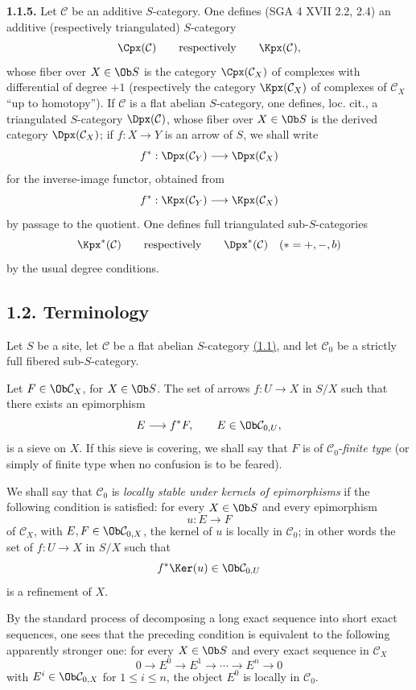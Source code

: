 \textbf{1.1.5.} Let \(\mathcal C\) be an additive \(S\)-category. One defines (SGA 4 XVII 2.2, 2.4) an additive (respectively triangulated) \(S\)-category
\[
  \Cpx(\mathcal C)\qquad\text{respectively}\qquad \Kpx(\mathcal C),
\]
whose fiber over \(X\in\Ob S\) is the category \(\Cpx(\mathcal C_X)\) of complexes with differential of degree \(+1\) (respectively the category \(\Kpx(\mathcal C_X)\) of complexes of \(\mathcal C_X\) ``up to homotopy''). If \(\mathcal C\) is a flat abelian \(S\)-category, one defines, loc. cit., a triangulated \(S\)-category \(\Dpx(\mathcal C)\), whose fiber over \(X\in\Ob S\) is the derived category \(\Dpx(\mathcal C_X)\); if \(f:X\to Y\) is an arrow of \(S\), we shall write
\[
  f^*:\Dpx(\mathcal C_Y)\longrightarrow \Dpx(\mathcal C_X)
\]
for the inverse-image functor, obtained from
\[
  f^*:\Kpx(\mathcal C_Y)\longrightarrow \Kpx(\mathcal C_X)
\]
by passage to the quotient. One defines full triangulated sub-\(S\)-categories
\[
  \Kpx^*(\mathcal C)\qquad\text{respectively}\qquad \Dpx^*(\mathcal C)
  \quad (*=+,-,b)
\]
by the usual degree conditions.

\subsection*{1.2. Terminology}

Let \(S\) be a site, let \(\mathcal C\) be a flat abelian \(S\)-category \hyperlink{sga6.e01.sec.1.1}{(1.1)}, and let \(\mathcal C_0\) be a strictly full fibered sub-\(S\)-category.

Let \(F\in\Ob \mathcal C_X\), for \(X\in\Ob S\). The set of arrows \(f:U\to X\) in \(S/X\) such that there exists an epimorphism
\[
  E\longrightarrow f^*F,\qquad E\in\Ob \mathcal C_{0,U},
\]
is a sieve on \(X\). If this sieve is covering, we shall say that \(F\) is of \(\mathcal C_0\)-\emph{finite type} (or simply of finite type when no confusion is to be feared).

We shall say that \(\mathcal C_0\) is \emph{locally stable under kernels of epimorphisms} if the following condition is satisfied: for every \(X\in\Ob S\) and every epimorphism
\[
  u:E\longrightarrow F
\]
of \(\mathcal C_X\), with \(E,F\in\Ob\mathcal C_{0,X}\), the kernel of \(u\) is locally in \(\mathcal C_0\); in other words the set of \(f:U\to X\) in \(S/X\) such that
\[
  f^*\Ker(u)\in\Ob\mathcal C_{0,U}
\]
is a refinement of \(X\).

By the standard process of decomposing a long exact sequence into short exact sequences, one sees that the preceding condition is equivalent to the following apparently stronger one: for every \(X\in\Ob S\) and every exact sequence in \(\mathcal C_X\)
\begin{equation}\tag{*}
  0\longrightarrow E^0\longrightarrow E^1\longrightarrow\cdots\longrightarrow E^n\longrightarrow 0
\end{equation}
with \(E^i\in\Ob\mathcal C_{0,X}\) for \(1\leq i\leq n\), the object \(E^0\) is locally in \(\mathcal C_0\).

